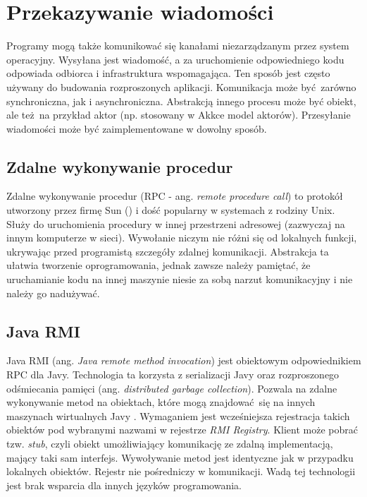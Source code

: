 \section{Przekazywanie wiadomości}

Programy mogą także komunikować się kanałami niezarządzanym przez system operacyjny. Wysyłana jest wiadomość, a za uruchomienie odpowiedniego kodu odpowiada odbiorca i infrastruktura wspomagająca. Ten sposób jest często używany do budowania rozproszonych aplikacji. Komunikacja może być zarówno synchroniczna, jak i asynchroniczna. Abstrakcją innego procesu może być obiekt, ale też na przykład aktor (np. stosowany w Akkce\cite{akka} model aktorów). Przesyłanie wiadomości może być zaimplementowane w dowolny sposób.


\subsection{Zdalne wykonywanie procedur}

Zdalne wykonywanie procedur (RPC - ang. \textit{remote procedure call}) to protokół utworzony przez firmę Sun (\cite{rpc}) i dość popularny w systemach z rodziny Unix. Służy do uruchomienia procedury w innej przestrzeni adresowej (zazwyczaj na innym komputerze w sieci). Wywołanie niczym nie różni się od lokalnych funkcji, ukrywając przed programistą szczegóły zdalnej komunikacji. Abstrakcja ta ułatwia tworzenie oprogramowania, jednak zawsze należy pamiętać, że uruchamianie kodu na innej maszynie niesie za sobą narzut komunikacyjny i nie należy go nadużywać.


\subsection{Java RMI}

Java RMI (ang. \textit{Java remote method invocation}) jest obiektowym odpowiednikiem RPC dla Javy. Technologia ta korzysta z serializacji Javy oraz rozproszonego odśmiecania pamięci (ang. \textit{distributed garbage collection}). Pozwala na zdalne wykonywanie metod na obiektach, które mogą znajdować się na innych maszynach wirtualnych Javy \cite{JAVA_RMI}. Wymaganiem jest wcześniejsza rejestracja takich obiektów pod wybranymi nazwami w rejestrze \textit{RMI Registry}. Klient może pobrać tzw. \textit{stub}, czyli obiekt umożliwiający komunikację ze zdalną implementacją, mający taki sam interfejs. Wywoływanie metod jest identyczne jak w przypadku lokalnych obiektów. Rejestr nie pośredniczy w komunikacji. Wadą tej technologii jest brak wsparcia dla innych języków programowania.


